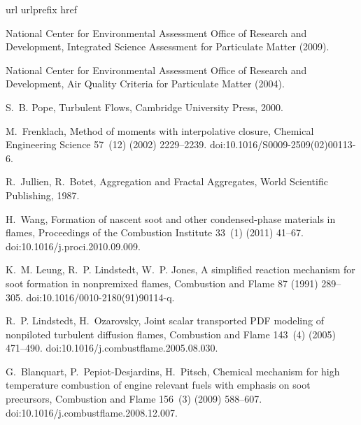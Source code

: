 \documentclass[preprint,letterpaper]{elsarticle}
\begin{document}
\begin{thebibliography}{10}
\expandafter\ifx\csname url\endcsname\relax
  \def\url#1{\texttt{#1}}\fi
\expandafter\ifx\csname urlprefix\endcsname\relax\def\urlprefix{URL }\fi
\expandafter\ifx\csname href\endcsname\relax
  \def\href#1#2{#2} \def\path#1{#1}\fi

{National Center for Environmental Assessment Office of Research and
  Development}, {Integrated Science Assessment for Particulate Matter} (2009).

{National Center for Environmental Assessment Office of Research and
  Development}, {Air Quality Criteria for Particulate Matter} (2004).

S.~B. Pope, {Turbulent Flows}, {Cambridge University Press}, 2000.

M.~Frenklach, {Method of moments with interpolative closure}, {Chemical
  Engineering Science} 57~(12) (2002) 2229--2239.
\newblock \href {http://dx.doi.org/10.1016/S0009-2509(02)00113-6}
  {\path{doi:10.1016/S0009-2509(02)00113-6}}.

R.~Jullien, R.~Botet, {Aggregation and Fractal Aggregates}, {World Scientific
  Publishing}, 1987.

H.~Wang, {Formation of nascent soot and other condensed-phase materials in
  flames}, {Proceedings of the Combustion Institute} 33~(1) (2011) 41--67.
\newblock \href {http://dx.doi.org/10.1016/j.proci.2010.09.009}
  {\path{doi:10.1016/j.proci.2010.09.009}}.

K.~M. Leung, R.~P. Lindstedt, W.~P. Jones, {A simplified reaction mechanism for
  soot formation in nonpremixed flames}, {Combustion and Flame} 87 (1991)
  289--305.
\newblock \href {http://dx.doi.org/10.1016/0010-2180(91)90114-q}
  {\path{doi:10.1016/0010-2180(91)90114-q}}.

R.~P. Lindstedt, H.~Ozarovsky, {Joint scalar transported {PDF} modeling of
  nonpiloted turbulent diffusion flames}, {Combustion and Flame} 143~(4) (2005)
  471--490.
\newblock \href {http://dx.doi.org/10.1016/j.combustflame.2005.08.030}
  {\path{doi:10.1016/j.combustflame.2005.08.030}}.

G.~Blanquart, P.~Pepiot-Desjardins, H.~Pitsch, {Chemical mechanism for high
  temperature combustion of engine relevant fuels with emphasis on soot
  precursors}, {Combustion and Flame} 156~(3) (2009) 588--607.
\newblock \href {http://dx.doi.org/10.1016/j.combustflame.2008.12.007}
  {\path{doi:10.1016/j.combustflame.2008.12.007}}.


\end{thebibliography}
\end{document}
